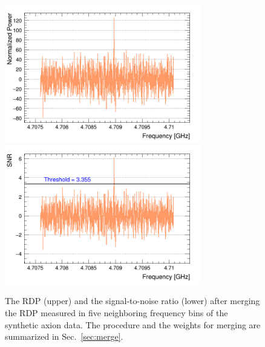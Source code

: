 \begin{figure}[htbp]                                                                                                  
    \centering                                                                                                                       
    \includegraphics[width=8.6cm]{figures/Power_GrandSpectrum_FaxionRun_AllSteps_Rescan_Merged_5bin_SG4_W201_LqWeight.png}
    \includegraphics[width=8.6cm]{figures/SNR_GrandSpectrum_FaxionRun_AllSteps_Rescan_Merged_5bin_SG4_W201_LqWeight.png}
    \caption{The RDP (upper) and the signal-to-noise ratio (lower) after 
merging the RDP measured in five neighboring frequency bins of the 
synthetic axion data. 
The procedure and the weights for merging 
are summarized in Sec.~\ref{sec:merge}.}                
\label{fig:faxionmerge}    
\end{figure}                       

   
